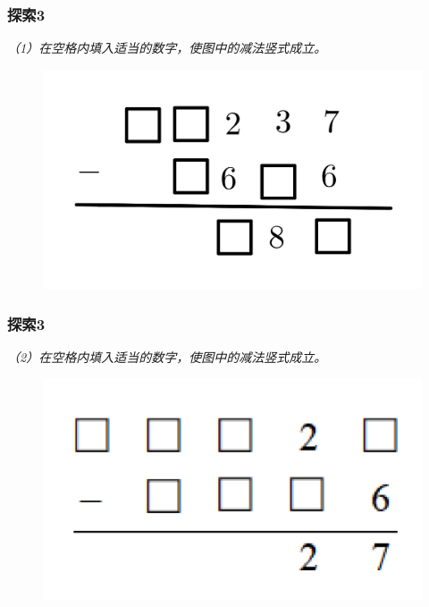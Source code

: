 \begin{frame}
    \frametitle{探索3}
    \textit{（1）在空格内填入适当的数字，使图中的减法竖式成立。}
    \begin{figure}[H] 
        \centering
        \includegraphics[width=1\textwidth]{./pics/Chapter_3/tansuo3_1.png}
    \end{figure}
\end{frame}

\begin{frame}
    \frametitle{探索3}
    \textit{（2）在空格内填入适当的数字，使图中的减法竖式成立。}
    \begin{figure}[H] 
        \centering
        \includegraphics[width=1\textwidth]{./pics/Chapter_3/tansuo3_2.png}
    \end{figure}
\end{frame}


